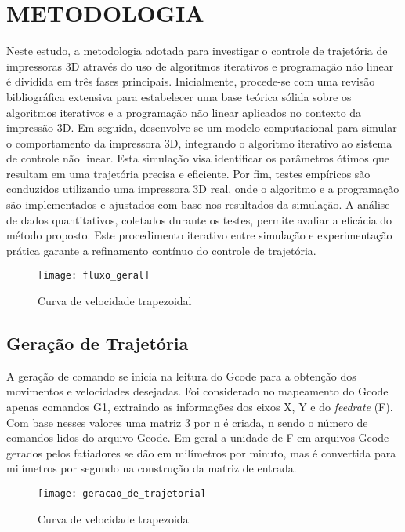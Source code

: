 \chapter{METODOLOGIA}
Neste estudo, a metodologia adotada para investigar o controle de trajetória de impressoras 3D através do uso de algoritmos iterativos e programação não linear é dividida em três fases principais. Inicialmente, procede-se com uma revisão bibliográfica extensiva para estabelecer uma base teórica sólida sobre os algoritmos iterativos e a programação não linear aplicados no contexto da impressão 3D. Em seguida, desenvolve-se um modelo computacional para simular o comportamento da impressora 3D, integrando o algoritmo iterativo ao sistema de controle não linear. Esta simulação visa identificar os parâmetros ótimos que resultam em uma trajetória precisa e eficiente. Por fim, testes empíricos são conduzidos utilizando uma impressora 3D real, onde o algoritmo e a programação são implementados e ajustados com base nos resultados da simulação. A análise de dados quantitativos, coletados durante os testes, permite avaliar a eficácia do método proposto. Este procedimento iterativo entre simulação e experimentação prática garante a refinamento contínuo do controle de trajetória.

\begin{figure}[H]
    \centering
    \caption{Curva de velocidade trapezoidal}
    \texttt{[image: fluxo\_geral]}

    \label{fig:fluxo_geral}
\end{figure}

\section{Geração de Trajetória}

A geração de comando se inicia na leitura do Gcode para a obtenção dos movimentos e velocidades desejadas. Foi considerado no mapeamento do Gcode apenas comandos G1, extraindo as informações dos eixos X, Y e do \textit{feedrate} (F). Com base nesses valores uma matriz 3 por n é criada, n sendo o número de comandos lidos do arquivo Gcode. Em geral a unidade de F em arquivos Gcode gerados pelos fatiadores se dão em milímetros por minuto, mas é convertida para milímetros por segundo na construção da matriz de entrada.

\begin{figure}[H]
    \centering
    \caption{Curva de velocidade trapezoidal}
    \texttt{[image: geracao\_de\_trajetoria]}

    \label{fig:geracao_de_trajetoria}
\end{figure}

